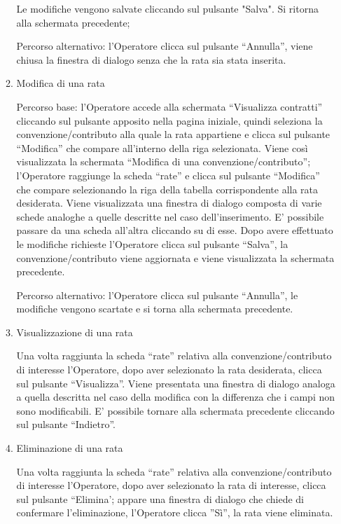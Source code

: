\begin{enumerate}
\begin{enumerate}
Le modifiche vengono salvate cliccando sul pulsante "Salva". Si ritorna alla schermata precedente;

Percorso alternativo:
l'Operatore clicca sul pulsante ``Annulla'', viene chiusa la finestra di dialogo senza che la rata sia stata inserita.

\item Modifica di una rata\\ \label{UC_edit_installment}

Percorso base:
l'Operatore accede alla schermata ``Visualizza contratti'' cliccando sul pulsante apposito nella pagina iniziale, quindi seleziona la convenzione/contributo alla quale la rata appartiene e clicca sul pulsante ``Modifica'' che compare
all'interno della riga selezionata. Viene così visualizzata la schermata ``Modifica di una convenzione/contributo''; l'Operatore raggiunge la scheda ``rate'' e clicca sul pulsante ``Modifica'' che compare selezionando la riga della tabella
corrispondente alla rata desiderata. Viene visualizzata una finestra di dialogo composta di varie schede analoghe a quelle descritte nel caso dell'inserimento. E' possibile passare da una scheda all'altra cliccando su di esse.
Dopo avere effettuato le modifiche richieste l'Operatore clicca sul pulsante ``Salva'', la convenzione/contributo viene aggiornata e viene visualizzata la schermata precedente.

Percorso alternativo:
l'Operatore clicca sul pulsante ``Annulla'', le modifiche vengono scartate e si torna alla schermata precedente.

\item Visualizzazione di una rata \label{UC_view_installment}

Una volta raggiunta la scheda ``rate'' relativa alla convenzione/contributo di interesse l'Operatore, dopo aver selezionato la rata desiderata, clicca sul pulsante ``Visualizza''. Viene presentata una finestra di dialogo analoga a quella descritta nel caso della modifica 
con la differenza che i campi non sono modificabili. E' possibile tornare alla schermata precedente cliccando sul pulsante ``Indietro''.

\item Eliminazione di una rata\\ \label{UC_delete_installment}

Una volta raggiunta la scheda ``rate'' relativa alla convenzione/contributo di interesse l'Operatore, dopo aver selezionato la rata di interesse, clicca sul pulsante ``Elimina'; appare una finestra di dialogo che chiede di confermare
l'eliminazione, l'Operatore clicca ''Sì'', la rata viene eliminata.


\end{enumerate}
\end{enumerate}
